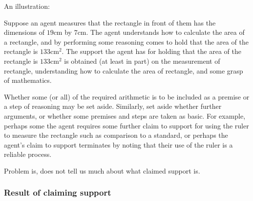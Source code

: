 \begin{note}
  An illustration:

  \begin{illustration}\label{ill:rectangle:basic}
    Suppose an agent measures that the rectangle in front of them has the dimensions of \(19\text{cm}\) by \(7\text{cm}\).
    The agent understands how to calculate the area of a rectangle, and by performing some reasoning comes to hold that the area of the rectangle is \(133\text{cm}^{2}\).
    The support the agent has for holding that the area of the rectangle is \(133\text{cm}^{2}\) is obtained (at least in part) on the measurement of rectangle, understanding how to calculate the area of rectangle, and some grasp of mathematics.
  \end{illustration}

  Whether some (or all) of the required arithmetic is to be included as a premise or a step of reasoning may be set aside.
  Similarly, set aside whether further arguments, or whether some premises and steps are taken as basic.
  For example, perhaps some the agent requires some further claim to support for using the ruler to measure the rectangle such as comparison to a standard, or perhaps the agent's claim to support terminates by noting that their use of the ruler is a reliable process.
\end{note}

\begin{note}
  \color{red}
  Problem is, \USE{} does not tell us much about what claimed support is.
\end{note}

\subsubsection{Result of claiming support}

